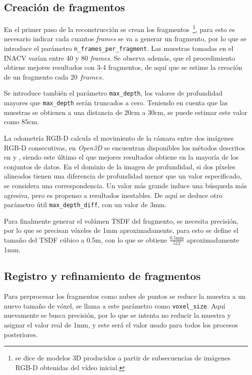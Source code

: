 \subsection{Creación de fragmentos}

En el primer paso de la reconstrucción se crean los fragmentos~\footnote{se dice de modelos 3D producidos a partir de subsecuencias de imágenes RGB-D obtenidas del vídeo inicial.}, para esto es necesario indicar cada cuantos \textit{frames} se va a generar un fragmento, por lo que se introduce el parámetro \verb|n_frames_per_fragment|. Las muestras tomadas en el INACV varían entre 40 y 80 \textit{frames}. Se observa además, que el procedimiento obtiene mejores resultados con 3-4 fragmentos, de aquí que se estime la creación de un fragmento cada 20 $frames$.

Se introduce también el parámetro \verb|max_depth|, los valores de profundidad mayores que \verb|max_depth| serán truncados a cero. Teniendo en cuenta que las muestras se obtienen a una distancia de $20\text{cm}$ a $30\text{cm}$, se puede estimar este valor como $85\text{cm}$.

La odometría RGB-D calcula el movimiento de la cámara entre dos imágenes RGB-D consecutivas, en \textit{Open3D} se encuentran disponibles los métodos descritos en \cite{steinbrucker2011real} y \cite{park2017colored}, siendo este último el que mejores resultados obtiene en la mayoría de los conjuntos de datos. En el dominio de la imagen de profundidad, si dos píxeles alineados tienen una diferencia de profundidad menor que un valor especificado, se considera una correspondencia. Un valor más grande induce una búsqueda más agresiva, pero es propenso a resultados inestables. De aquí se deduce otro parámetro útil \verb|max_depth_diff|, con un valor de $3\text{mm}$.

Para finalmente generar el volúmen TSDF del fragmento, se necesita precisión, por lo que se precisan vóxeles de 1mm aproximadamente, para esto se define el tamaño del TSDF cúbico a 0.5m, con lo que se obtiene $\frac{0.5\text{mm}}{512}$ aproximadamente 1mm.

\subsection{Registro y refinamiento de fragmentos}

Para preprocesar los fragmentos como nubes de puntos se reduce la muestra a un nuevo tamaño de vóxel, se llama a este parámetro como \verb|voxel_size|. Aquí nuevamente se busca precisión, por lo que se intenta no reducir la muestra y asignar el valor real de 1mm, y este será el valor usado para todos los procesos posteriores.

